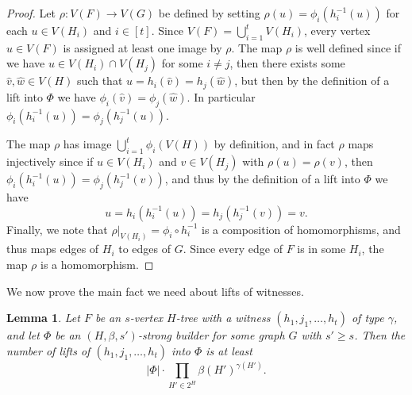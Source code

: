 \documentclass[12pt,letterpaper]{article}
\newtheorem{lemma}[theorem]{Lemma}
\theoremstyle{definition}
\begin{document}
	\begin{proof}
		Let $\rho:V(F)\to V(G)$ be defined by setting $\rho(u)=\phi_i(h_i^{-1}(u))$ for each $u\in V(H_i)$ and $i\in [t]$. Since $V(F)=\bigcup_{i=1}^t V(H_i)$, every vertex $u\in V(F)$ is assigned at least one image by $\rho$. The map $\rho$ is well defined since if we have $u\in V(H_i)\cap V(H_j)$ for some $i\neq j$, then there exists some $\hat{v},\hat{w}\in V(H)$ such that $u=h_i(\hat{v})=h_j(\hat{w})$, but then by the definition of a lift into $\Phi$ we have $\phi_i(\hat{v})=\phi_j(\hat{w})$. In particular $\phi_i(h_i^{-1}(u))=\phi_j(h_j^{-1}(u))$. 
		
		The map $\rho$ has image $\bigcup_{i=1}^t \phi_i(V(H))$ by definition, and in fact $\rho$ maps injectively since if $u\in V(H_i)$ and $v\in V(H_j)$ with $\rho(u)=\rho(v)$, then $\phi_i(h_i^{-1}(u))=\phi_j(h_j^{-1}(v))$, and thus by the definition of a lift into $\Phi$ we have \[u=h_i(h_i^{-1}(u))=h_j(h_j^{-1}(v))=v.\]  Finally, we note that $\rho|_{V(H_i)}=\phi_i\circ h_i^{-1}$ is a composition of homomorphisms, and thus maps edges of $H_i$ to edges of $G$. Since every edge of $F$ is in some $H_i$, the map $\rho$ is a homomorphism.
	\end{proof}
	We now prove the main fact we need about lifts of witnesses.
	
	\begin{lemma}\label{lemma counting trees in a strong builder}
		Let $F$ be an $s$-vertex $H$-tree with a witness $(h_1,j_1,\dots,h_t)$ of type $\gamma$, and let $\Phi$ be an $(H,\beta,s')$-strong builder for some graph $G$ with $s'\geq s$. Then the number of lifts of $(h_1,j_1,\dots,h_t)$ into $\Phi$ is at least
		\[
		|\Phi|\cdot\prod_{H'\in 2^H} \beta(H')^{\gamma(H')}.
		\]
	\end{lemma}
	
\end{document}

